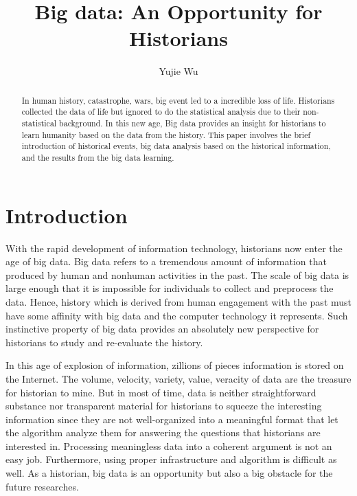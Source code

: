 \documentclass[sigconf]{acmart}
\begin{document}
\title{Big data: An Opportunity for Historians}


\author{Yujie Wu}



\renewcommand{\shortauthors}{B. Trovato et al.}


\begin{abstract}
\large  In human history, catastrophe, wars, big event led to a incredible loss of life. Historians collected the data of life but ignored to do the statistical analysis due to their non-statistical background. In this new age, Big data provides an insight for historians to learn humanity based on the data from the history. This paper involves the brief introduction of historical events, big data analysis based on the historical information, and the results from the big data learning.  
\end{abstract}


\maketitle

\section{Introduction}
\large With the rapid development of information technology, historians now enter the age of big data. Big data refers to a tremendous 
amount of information that produced by human and nonhuman activities in the past. The scale of big data is large enough that it is 
impossible for individuals to collect and preprocess the data. Hence, history which is derived from human engagement with the past must
have some affinity with big data and the computer technology it represents\cite{C1}. Such instinctive property of big data provides an
absolutely new perspective for historians to study and re-evaluate the history. 

\par 
In this age of explosion of information, zillions of pieces information is stored on the Internet. The volume, velocity, variety, value, veracity of data are the treasure for historian to mine. But in most of time, data is neither straightforward substance nor transparent material for historians to squeeze the interesting information since they are not well-organized into a meaningful format that let the algorithm analyze them for answering the questions that historians are interested in\cite{C1}. Processing meaningless data into a coherent argument is not an easy job. Furthermore, using proper infrastructure and algorithm is difficult as well. As a historian, big data is an opportunity but also a big obstacle for the future researches.  
\end{document}
